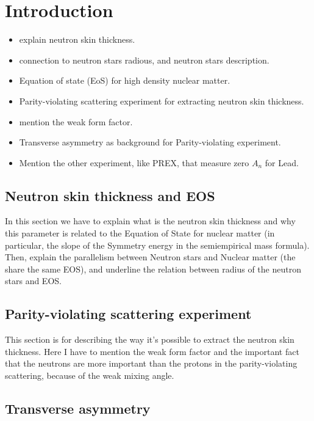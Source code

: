 
\chapter{Introduction} \label{intro} 

\begin{itemize}
\item explain neutron skin thickness.
\item connection to neutron stars radious, and neutron stars description.
\item Equation of state (EoS) for high density nuclear matter.
\item Parity-violating scattering experiment for extracting neutron skin thickness.
\item mention the weak form factor.
\item Transverse asymmetry as background for Parity-violating experiment. 
\item Mention the other experiment, like PREX, that measure zero $A_{n}$ for Lead.
\end{itemize}

\section{Neutron skin thickness and EOS}

In this section we have to explain what is the neutron skin thickness and why this parameter is related to the Equation of State for nuclear matter (in particular, the slope of the Symmetry energy in the semiempirical mass formula). Then, explain the parallelism between Neutron stars and Nuclear matter (the share the same EOS), and underline the relation between radius of the neutron stars and EOS.

\section{Parity-violating scattering experiment}

This section is for describing the way it's possible to extract the neutron skin thickness. Here I have to mention the weak form factor and the important fact that the neutrons are more important than the protons in the parity-violating scattering, because of the weak mixing angle.

\section{Transverse asymmetry}

